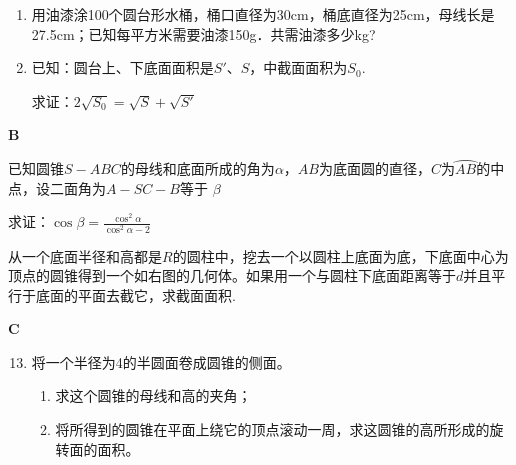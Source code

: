 \begin{enumerate}
\item 用油漆涂100个圆台形水桶，桶口直径为30cm，桶底直径为25cm，母线长是27.5cm；已知每平方米需要油漆150g．共需油漆多少kg?
\item 已知：圆台上、下底面面积是$S'$、$S$，中截面面积为$S_0$. 

求证：$2\sqrt{S_0}=\sqrt{S}+\sqrt{S'}$
\end{enumerate}

\begin{center}
    \bfseries B
\end{center}

\begin{enumerate}\setcounter{enumi}{10}
    \item 已知圆锥$S-ABC$的母线和底面所成的角为$\alpha$，$AB$为底面圆的直径，$C$为$\wideparen{AB}$的中点，设二面角为$A-SC-B$等于
$\beta$

求证：$\cos\beta=\frac{\cos^2\alpha}{\cos^2\alpha-2}$

\noindent
\begin{minipage}{.6\textwidth}
\item 从一个底面半径和高都是$R$的圆柱中，挖去一个以圆柱上底面为底，下底面中心为顶点的圆锥得到一个如右图的几何体。如果用一个与圆柱下底面距离等于$d$并且平行于底面的平面去截它，求截面面积.
\end{minipage}
\hfill
\begin{minipage}{.38\textwidth}
\centering
{}
\end{minipage}
\end{enumerate}


\begin{center}
    \bfseries C
\end{center}

\begin{enumerate}\setcounter{enumi}{12  }
    \item 将一个半径为4的半圆面卷成圆锥的侧面。
\begin{enumerate}[(1)]
\item 求这个圆锥的母线和高的夹角；
\item 将所得到的圆锥在平面上绕它的顶点滚动一周，求这圆锥的高所形成的旋转面的面积。
\end{enumerate}
\end{enumerate}

